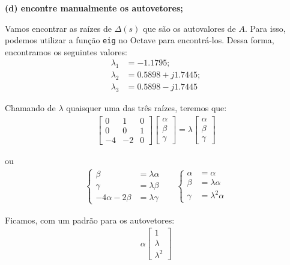 \documentclass[11pt]{article}
\begin{document}
\textbf{(d) encontre manualmente os autovetores;}

Vamos encontrar as raízes de $\Delta(s)$ que são os autovalores de $A$. Para isso, podemos utilizar a função \texttt{eig} no Octave para encontrá-los. Dessa forma, encontramos os seguintes valores:
\begin{align*}
  \lambda_1 &= -1.1795;\\
  \lambda_2 &= 0.5898 + j1.7445;\\
  \lambda_3 &= 0.5898 - j1.7445
\end{align*}

Chamando de $\lambda$ quaisquer uma das três raízes, teremos que:
\begin{align*}
  \begin{bmatrix}
    0 & 1 & 0\\
    0 & 0 & 1\\
    -4 & -2 & 0
  \end{bmatrix}
  \begin{bmatrix}
    \alpha\\
    \beta\\
    \gamma
  \end{bmatrix}
  =
  \lambda
  \begin{bmatrix}
    \alpha\\
    \beta\\
    \gamma
  \end{bmatrix}
\end{align*}

ou
\begin{align*}
  \begin{cases}
    \beta  &= \lambda \alpha\\
    \gamma &= \lambda \beta\\
    -4\alpha - 2\beta &= \lambda \gamma
  \end{cases}
  &
  &
  \begin{cases}
    \alpha &= \alpha\\
    \beta  &= \lambda \alpha\\
    \gamma &= \lambda^2 \alpha
  \end{cases}
\end{align*}

Ficamos, com um padrão para os autovetores:
\begin{align*}
  \alpha
  \begin{bmatrix}
    1\\
    \lambda\\
    \lambda^2
  \end{bmatrix}
\end{align*}
\end{document}

